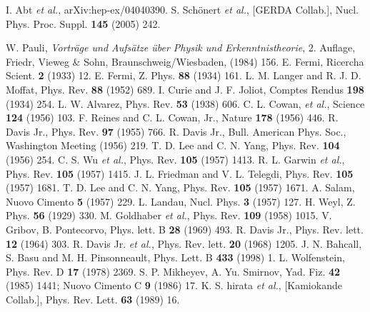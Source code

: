 \begin{thebibliography}{99}
 I. Abt \textit{et al.}, arXiv:hep-ex/04040390.
 S. Sch\"onert \textit{et al.}, [GERDA Collab.], Nucl. Phys. Proc. Suppl. \textbf{145} (2005) 242.

W. Pauli, \emph{Vortr\"age und Aufs\"atze \"uber Physik     und Erkenntnistheorie}, 2. Auflage, Friedr, Vieweg \& Sohn,   Braunschweig/Wiesbaden, (1984) 156.
E. Fermi, Ricercha Scient. \textbf{2} (1933) 12.
E. Fermi, Z. Phys. \textbf{88} (1934) 161.
L. M. Langer and R. J. D. Moffat, Phys. Rev.   \textbf{88} (1952) 689.
I. Curie and J. F. Joliot, Comptes Rendus \textbf{198}   (1934) 254.
L. W. Alvarez, Phys. Rev. \textbf{53} (1938) 606.
 C. L. Cowan, \textit{et al.}, Science \textbf{124}   (1956) 103.
F. Reines and C. L. Cowan, Jr., Nature \textbf{178} (1956) 446.
R. Davis Jr., Phys. Rev. \textbf{97} (1955) 766.
R. Davis Jr., Bull. American Phys. Soc., Washington   Meeting (1956) 219.
T. D. Lee and C. N. Yang, Phys. Rev. \textbf{104}  
(1956) 254.
C. S. Wu \textit{et al.}, Phys. Rev. \textbf{105} (1957)  
1413.
R. L. Garwin \textit{et al.}, Phys. Rev. \textbf{105}  
(1957) 1415.
J. L. Friedman and V. L. Telegdi, Phys. Rev.  
\textbf{105} (1957) 1681.
T. D. Lee and C. N. Yang, Phys. Rev. \textbf{105}   (1957) 1671.
A. Salam, Nuovo Cimento \textbf{5} (1957) 229.
L. Landau, Nucl. Phys. \textbf{3} (1957) 127.
H. Weyl, Z. Phys. \textbf{56} (1929) 330.
M. Goldhaber \textit{et al.}, Phys. Rev. \textbf{109}   (1958) 1015.
V. Gribov, B. Pontecorvo, Phys. lett. B \textbf{28}   (1969) 493.
R. Davis Jr., Phys. Rev. lett. \textbf{12} (1964) 303.
R. Davis Jr. \textit{et al.}, Phys. Rev. lett.   \textbf{20} (1968) 1205.
J. N. Bahcall, S. Basu and M. H. Pinsonneault, Phys.   Lett. B \textbf{433} (1998) 1.
L. Wolfenstein, Phys. Rev. D \textbf{17} (1978) 2369.
S. P. Mikheyev, A. Yu. Smirnov, Yad. Fiz. \textbf{42}  
(1985) 1441; Nuovo Cimento C \textbf{9} (1986) 17.
K. S. hirata \textit{et al.}, [Kamiokande Collab.],   Phys. Rev. Lett. \textbf{63} (1989) 16.

\end{thebibliography}
